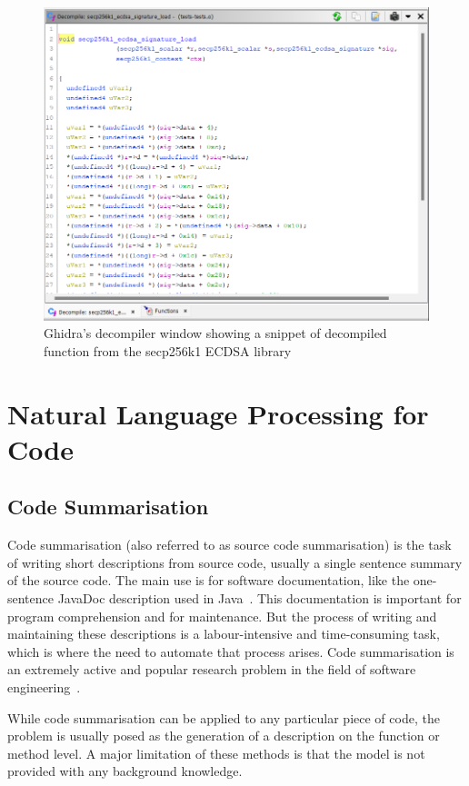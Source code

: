 \begin{figure}[tbh]
  \centering
  \includegraphics[width=\linewidth]{img/decompiler.png}
  \caption{Ghidra's decompiler window showing a snippet of decompiled function from the secp256k1 ECDSA library}
  \label{fig:decompiler}
\end{figure}

\newpage
\section{Natural Language Processing for Code}

\subsection{Code Summarisation}
Code summarisation (also referred to as source code summarisation) is the task of writing short descriptions from source code, usually a single sentence summary of the source code. The main use is for software documentation, like the one-sentence JavaDoc description used in Java~\cite{recommend_summarization}. This documentation is important for program comprehension and for maintenance. But the process of writing and maintaining these descriptions is a labour-intensive and time-consuming task, which is where the need to automate that process arises. Code summarisation is an extremely active and popular research problem in the field of software engineering~\cite{recommend_summarization}.

While code summarisation can be applied to any particular piece of code, the problem is usually posed as the generation of a description on the function or method level. A major limitation of these methods is that the model is not provided with any background knowledge. 

